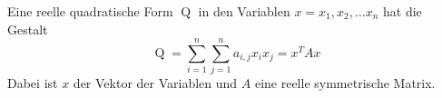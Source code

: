 Eine reelle quadratische Form $\operatorname{Q}$ in den Variablen $x = x_1, x_2, \dots x_n$ hat die Gestalt
$$\operatorname{Q} = \sum\limits_{i =1}^n \sum\limits_{j =1}^n a_{i, j} x_i x_j = x^T A x$$ 
Dabei ist $x$  der Vektor der Variablen und $A$ eine reelle symmetrische Matrix.
